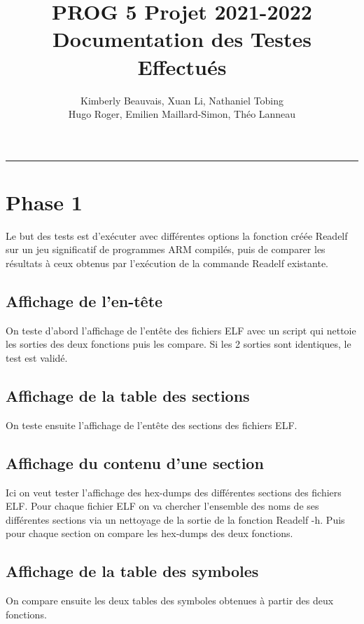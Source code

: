 \documentclass[a4paper]{article} %
\title{PROG 5 Projet 2021-2022 \\
\large Documentation des Testes Effectués}
\author{Kimberly Beauvais, Xuan Li, Nathaniel Tobing \\
Hugo Roger, Emilien Maillard-Simon, Théo Lanneau}
\begin{document}
\maketitle
\begin{center}
\rule{\textwidth}{1pt}
\end{center}

\renewcommand{\contentsname}{Table des Matières}
\tableofcontents

\section{Phase 1}
Le but des tests est d’exécuter avec différentes options la fonction créée 
Readelf sur un jeu significatif de programmes ARM compilés, puis de comparer 
les résultats à ceux obtenus par l’exécution de la commande Readelf existante.


\subsection{Affichage de l’en-tête}
On teste d’abord l’affichage de l’entête des fichiers ELF avec un script qui 
nettoie les sorties des deux fonctions puis les compare. Si les 2 sorties sont 
identiques, le test est validé.

\subsection{Affichage de la table des sections}
On teste ensuite l’affichage de l’entête des sections des fichiers ELF.

\subsection{Affichage du contenu d'une section}
Ici on veut tester l’affichage des hex-dumps des différentes sections des 
fichiers ELF. Pour chaque fichier ELF on va chercher l’ensemble des noms de 
ses différentes sections via un nettoyage de la sortie de la fonction Readelf -h.
Puis pour chaque section on compare les hex-dumps des deux fonctions.



\subsection{Affichage de la table des symboles}
On compare ensuite les deux tables des symboles obtenues à partir des deux 
fonctions.
\end{document}
